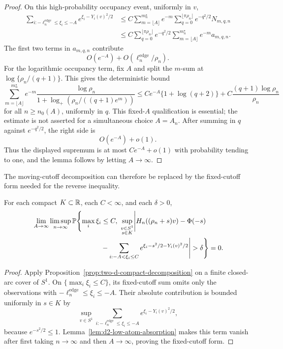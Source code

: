 \begin{proof}
On this high-probability occupancy event, uniformly in \(v\),
\[
\begin{aligned}
    \sum_{i:-\ell_n^{\mathrm{edge}}\le \xi_i\le-A}e^{\xi_i-Y_i(v)^2/2}
    &\le
    C\sum_{m=\lfloor A\rfloor}^{m_n^\star} e^{-m}
    \sum_{q=0}^{\lfloor\pi\rho_n\rfloor}
        e^{-q^2/2}N_{m,q,n} \\
    &\le
    C\sum_{q=0}^{\lfloor\pi\rho_n\rfloor}e^{-q^2/2}
    \sum_{m=\lfloor A\rfloor}^{m_n^\star} e^{-m}a_{m,q,n}.
\end{aligned}
\]
The first two terms in \(a_{m,q,n}\) contribute
\[
    O(e^{-A})+O(\ell_n^{\mathrm{edge}}/\rho_n).
\]
For the logarithmic occupancy term, fix \(A\) and split the \(m\)-sum at
\(\log\{\rho_n/(q+1)\}\).  This gives the deterministic bound
\[
    \sum_{m=\lfloor A\rfloor}^{m_n^\star}
    e^{-m}
    \frac{\log\rho_n}
        {1+\log_+\!\left(\rho_n/((q+1)e^m)\right)}
    \le
    C e^{-A}\{1+\log(q+2)\}
    +C\frac{(q+1)\log\rho_n}{\rho_n}
\]
for all \(n\ge n_0(A)\), uniformly in \(q\). This fixed-\(A\) qualification
is essential; the estimate is not asserted for a simultaneous choice
\(A=A_n\).
After summing in \(q\) against \(e^{-q^2/2}\), the right side is
\[
    O(e^{-A})+o(1).
\]
Thus the displayed supremum is at most \(C e^{-A}+o(1)\) with probability
tending to one, and the lemma follows by letting \(A\to\infty\).
\end{proof}

The moving-cutoff decomposition can therefore be replaced by the fixed-cutoff
form needed for the reverse inequality.
\begin{lemma}
\label{lem:d2-fixed-cutoff-decomposition}
For each compact \(K\subset\mathbb R\), each \(C<\infty\), and each \(\delta>0\),
\[
\begin{aligned}
&\lim_{A\to\infty}\limsup_{n\to\infty}
\Pbb\Biggl\{
\max_i\xi_i\le C,\
\sup_{\substack{v\in S^1\\ s\in K}}
\Biggl|
H_n((\rho_n+s)v)-\Phi(-s)\\
&\hspace{35mm}
-\sum_{i:-A<\xi_i\le C}
e^{\xi_i-s^2/2-Y_i(v)^2/2}
\Biggr|>\delta
\Biggr\}=0 .
\end{aligned}
\]
\end{lemma}

\begin{proof}
Apply Proposition~\ref{prop:two-d-compact-decomposition} on a finite closed-arc
cover of \(S^1\). On \(\{\max_i\xi_i\le C\}\), its fixed-cutoff sum omits only
the observations with
\(-\ell_n^{\mathrm{edge}}\le \xi_i\le-A\). Their
absolute contribution is bounded uniformly in \(s\in K\) by
\[
    \sup_{v\in S^1}
    \sum_{i:-\ell_n^{\mathrm{edge}}\le \xi_i\le-A} e^{\xi_i-Y_i(v)^2/2},
\]
because \(e^{-s^2/2}\le1\).  Lemma~\ref{lem:d2-low-atom-absorption} makes
this term vanish after first taking \(n\to\infty\) and then \(A\to\infty\),
proving the fixed-cutoff form.
\end{proof}
